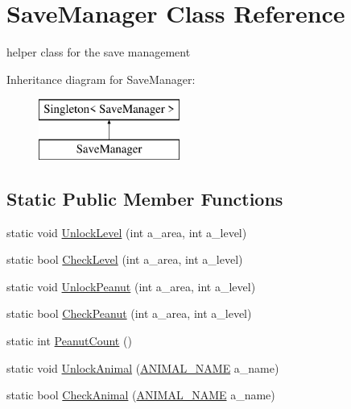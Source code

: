 \hypertarget{class_save_manager}{}\section{Save\+Manager Class Reference}
\label{class_save_manager}


helper class for the save management  


Inheritance diagram for Save\+Manager\+:\begin{figure}[H]
\begin{center}
\leavevmode
\includegraphics[height=2.000000cm]{class_save_manager}
\end{center}
\end{figure}
\subsection*{Static Public Member Functions}
\begin{DoxyCompactItemize}
\item 
static void \mbox{\hyperlink{class_save_manager_a15d355ec35b09a7b73996d8e11bc11eb}{Unlock\+Level}} (int a\+\_\+area, int a\+\_\+level)
\item 
static bool \mbox{\hyperlink{class_save_manager_a50508f281944398c5721197654ff9b3e}{Check\+Level}} (int a\+\_\+area, int a\+\_\+level)
\item 
static void \mbox{\hyperlink{class_save_manager_a2883f213fb94ad733e9ca4826e92e1b7}{Unlock\+Peanut}} (int a\+\_\+area, int a\+\_\+level)
\item 
static bool \mbox{\hyperlink{class_save_manager_a4062394b6bb7d1fe6212f5946d74fa08}{Check\+Peanut}} (int a\+\_\+area, int a\+\_\+level)
\item 
static int \mbox{\hyperlink{class_save_manager_a8f9d8e15152684f6f05b980ac9adf7e1}{Peanut\+Count}} ()
\item 
static void \mbox{\hyperlink{class_save_manager_ae067ae14a03adf8f77fb7c5077d84493}{Unlock\+Animal}} (\mbox{\hyperlink{_animal_8cs_a2fa5713399b84d1b88dae9196837af50}{A\+N\+I\+M\+A\+L\+\_\+\+N\+A\+ME}} a\+\_\+name)
\item 
static bool \mbox{\hyperlink{class_save_manager_a80374b27895fccd7ff7da0e3bff27e60}{Check\+Animal}} (\mbox{\hyperlink{_animal_8cs_a2fa5713399b84d1b88dae9196837af50}{A\+N\+I\+M\+A\+L\+\_\+\+N\+A\+ME}} a\+\_\+name)
\end{DoxyCompactItemize}
